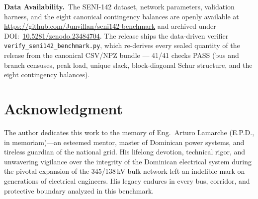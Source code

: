 \documentclass[11pt, journal, onecolumn]{IEEEtran}
\begin{document}
\noindent\textbf{Data Availability.}~The SENI-142 dataset, network parameters, validation harness, and the eight canonical contingency balances are openly available at \url{https://github.com/Junvillan/seni142-benchmark} and archived under DOI:~\href{https://doi.org/10.5281/zenodo.23484704}{10.5281/zenodo.23484704}. The release ships the data-driven verifier \texttt{verify\_seni142\_benchmark.py}, which re-derives every sealed quantity of the release from the canonical CSV/NPZ bundle --- 41/41 checks PASS (bus and branch censuses, peak load, unique slack, block-diagonal Schur structure, and the eight contingency balances).


\section*{Acknowledgment}
The author dedicates this work to the memory of Eng.~Arturo Lamarche (E.P.D., in memoriam)---an esteemed mentor, master of Dominican power systems, and tireless guardian of the national grid. His lifelong devotion, technical rigor, and unwavering vigilance over the integrity of the Dominican electrical system during the pivotal expansion of the 345/138\,kV bulk network left an indelible mark on generations of electrical engineers. His legacy endures in every bus, corridor, and protective boundary analyzed in this benchmark.




\end{document}
